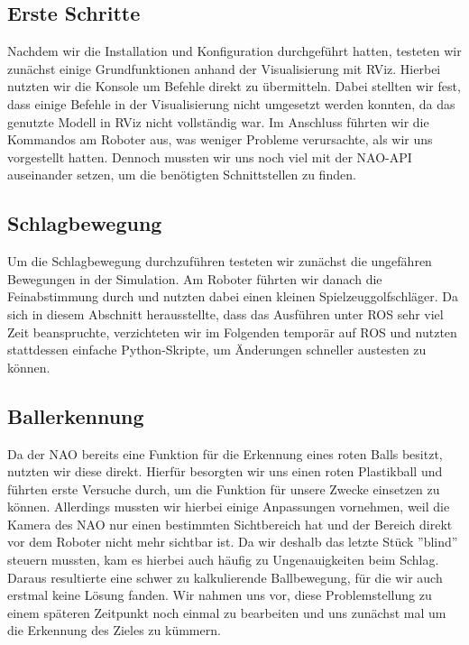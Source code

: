 \documentclass{scrartcl}
\begin{document}
\subsection{Erste Schritte}

Nachdem wir die Installation und Konfiguration durchgeführt hatten, testeten wir zunächst einige Grundfunktionen anhand der Visualisierung mit RViz.
Hierbei nutzten wir die Konsole um Befehle direkt zu übermitteln. Dabei stellten wir fest, dass einige Befehle in der Visualisierung nicht umgesetzt werden konnten, da das genutzte Modell in RViz nicht vollständig war.
Im Anschluss führten wir die Kommandos am Roboter aus, was weniger Probleme verursachte, als wir uns vorgestellt hatten. 
Dennoch mussten wir uns noch viel mit der NAO-API auseinander setzen, um die benötigten Schnittstellen zu finden.

\subsection{Schlagbewegung}

Um die Schlagbewegung durchzuführen testeten wir zunächst die ungefähren Bewegungen in der Simulation. Am Roboter führten wir danach die Feinabstimmung durch und nutzten dabei einen kleinen Spielzeuggolfschläger. 
Da sich in diesem Abschnitt herausstellte, dass das Ausführen unter ROS sehr viel Zeit beanspruchte, verzichteten wir im Folgenden temporär auf ROS und nutzten stattdessen einfache Python-Skripte, um Änderungen schneller austesten zu können.

\subsection{Ballerkennung}

Da der NAO bereits eine Funktion für die Erkennung eines roten Balls besitzt, nutzten wir diese direkt. Hierfür besorgten wir uns einen roten Plastikball und führten erste Versuche durch, um die Funktion für unsere Zwecke einsetzen zu können.
Allerdings mussten wir hierbei einige Anpassungen vornehmen, weil die Kamera des NAO nur einen bestimmten Sichtbereich hat und der Bereich direkt vor dem Roboter nicht mehr sichtbar ist. Da wir deshalb das letzte Stück ''blind'' steuern mussten, kam es hierbei auch häufig zu Ungenauigkeiten beim Schlag. Daraus resultierte eine schwer zu kalkulierende Ballbewegung, für die wir auch erstmal keine Lösung fanden. Wir nahmen uns vor, diese Problemstellung zu einem späteren Zeitpunkt noch einmal zu bearbeiten und uns zunächst mal um die Erkennung des Zieles zu kümmern.
\end{document}
